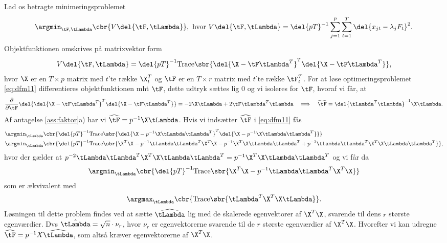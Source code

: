 Lad os betragte minimeringsproblemet
\begin{align}
\argmin_{\tF, \tLambda} \cbr{V \del{\tF, \tLambda}}, \text{ hvor } V \del{\tF, \tLambda} = \del{pT}^{-1} \sum_{j=1}^p \sum_{t=1}^T \del{x_{jt} -\lambda_j F_t}^2.  \label{eq:dfm11}
\end{align}
Objektfunktionen omskrives på matrixvektor form
\begin{align*}
V \del{\tF, \tLambda} = \del{pT}^{-1} \text{Trace} \sbr{ \del{\X - \tF \tLambda^T}^T \del{\X - \tF \tLambda^T}},
\end{align*}
hvor \(\X\) er en \(T \times p\) matrix med \(t\)'te række \(\X_t^T\) og \(\tF\) er en \(T \times r\) matrix med \(t\)'te række \(\tF_t^T\).
For at løse optimeringsproblemet \eqref{eq:dfm11} differentieres objektfunktionen mht \(\tF\), dette udtryk sættes lig 0 og vi isoleres for \(\tF\), hvoraf vi får, at
\begin{align*}
\frac{\partial}{\partial \tF} \del{\del{\X - \tF \tLambda^T}^T \del{\X - \tF \tLambda^T}} = -2 \X \tLambda + 2 \tF \tLambda^T \tLambda \quad \Longrightarrow \quad \widehat{\tF} = \del{\tLambda^T \tLambda}^{-1} \X \tLambda.
\end{align*}
Af antagelse \ref{ass:faktor}a) har vi  \(\widehat{\tF} = p^{-1} \X \tLambda\).
Hvis vi indsætter \(\widehat{\tF}\) i \eqref{eq:dfm11} fås
\begin{align*}
&\argmin_{\tLambda} \cbr{\del{pT}^{-1} \text{Trace} \sbr{ \del{\X - p^{-1} \X \tLambda \tLambda^T}^T \del{\X - p^{-1} \X \tLambda \tLambda^T}}} \\
&\argmin_{\tLambda} \cbr{\del{pT}^{-1}  \text{Trace} \sbr{\X^T \X - p^{-1} \tLambda \tLambda^T \X^T \X - p^{-1} \X^T \X \tLambda \tLambda^T + p^{-2} \tLambda \tLambda^T \X^T \X \tLambda \tLambda^T}},
\end{align*}
hvor der gælder at \(p^{-2} \tLambda \tLambda^T \X^T \X \tLambda \tLambda^T = p^{-1} \X^T \X \tLambda \tLambda^T\) og vi får da
\begin{align*}
\argmin_{\tLambda} \cbr{\del{pT}^{-1} \text{Trace} \sbr{\X^T \X - p^{-1} \tLambda \tLambda^T \X^T \X}}
\end{align*}
som er ækvivalent med
\begin{align*}
\argmax_{\tLambda} \cbr{ \text{Trace} \sbr{\tLambda^T \X^T \X \tLambda}}.
\end{align*}
Løsningen til dette problem findes ved at sætte \(\widehat{\tLambda}\) lig med de skalerede egenvektorer af \(\X^T \X\), svarende til dens \(r\) største egenværdier.
Dvs \(\hat{\tLambda} = \sqrt{n} \cdot \nu_r\), hvor \(\nu_r\) er egenvektorerne svarende til de \(r\) største egenværdier af \(\X^T \X\).
Hvorefter vi kan udregne \(\widehat{\tF} = p^{-1} X \widehat{\tLambda}\), som altså kræver egenvektorerne af \(\X^T \X\).

